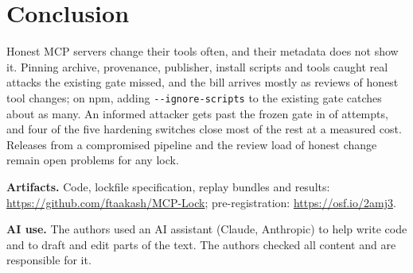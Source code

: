 \documentclass[conference]{IEEEtran}
\newcommand{\code}[1]{\texttt{#1}}
\begin{document}
\section{Conclusion}
Honest MCP servers change their tools often, and their metadata does not show it. Pinning archive, provenance,
publisher, install scripts and tools caught \AddedDet{} real attacks the existing gate missed, and the bill arrives
mostly as reviews of honest tool changes; on npm, adding \code{-{}-ignore-scripts} to the existing gate catches about
as many. An informed attacker gets past the frozen gate in \EGAllow{} of \ENCases{} attempts, and four of the five
hardening switches close most of the rest at a measured cost. Releases from a compromised pipeline and the review load
of honest change remain open problems for any lock.

\textbf{Artifacts.} Code, lockfile specification, replay bundles and results: \url{https://github.com/ftaakash/MCP-Lock};
pre-registration: \url{https://osf.io/2amj3}.

\textbf{AI use.} The authors used an AI assistant (Claude, Anthropic) to help write code and to draft and edit parts
of the text. The authors checked all content and are responsible for it.



\end{document}

